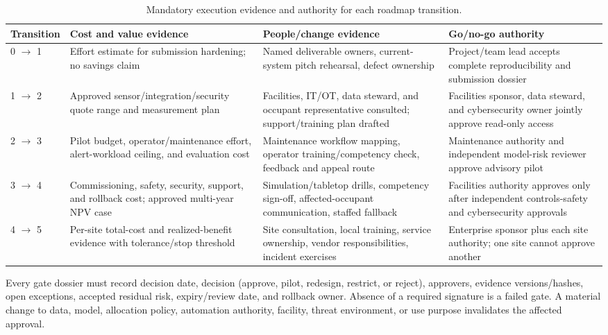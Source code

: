 \begin{table}[H]
\centering
\caption{Mandatory execution evidence and authority for each roadmap transition.}
\label{tab:gate-authority}
\begin{tabularx}{\textwidth}{L{0.13\textwidth}Y Y Y}
\toprule
Transition & Cost and value evidence & People/change evidence & Go/no-go authority\\
 $\rightarrow$ 1 & Effort estimate for submission hardening; no savings claim & Named deliverable owners, current-system pitch rehearsal, defect ownership & Project/team lead accepts complete reproducibility and submission dossier\\
1 $\rightarrow$ 2 & Approved sensor/integration/security quote range and measurement plan & Facilities, IT/OT, data steward, and occupant representative consulted; support/training plan drafted & Facilities sponsor, data steward, and cybersecurity owner jointly approve read-only access\\
2 $\rightarrow$ 3 & Pilot budget, operator/maintenance effort, alert-workload ceiling, and evaluation cost & Maintenance workflow mapping, operator training/competency check, feedback and appeal route & Maintenance authority and independent model-risk reviewer approve advisory pilot\\
3 $\rightarrow$ 4 & Commissioning, safety, security, support, and rollback cost; approved multi-year NPV case & Simulation/tabletop drills, competency sign-off, affected-occupant communication, staffed fallback & Facilities authority approves only after independent controls-safety and cybersecurity approvals\\
4 $\rightarrow$ 5 & Per-site total-cost and realized-benefit evidence with tolerance/stop threshold & Site consultation, local training, service ownership, vendor responsibilities, incident exercises & Enterprise sponsor plus each site authority; one site cannot approve another\\
\bottomrule
\end{tabularx}
\end{table}

Every gate dossier must record decision date, decision (approve, pilot, redesign, restrict, or reject), approvers, evidence versions/hashes, open exceptions, accepted residual risk, expiry/review date, and rollback owner. Absence of a required signature is a failed gate. A material change to data, model, allocation policy, automation authority, facility, threat environment, or use purpose invalidates the affected approval.


